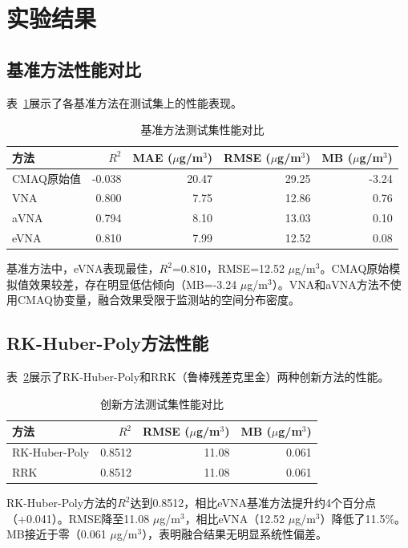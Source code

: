 \documentclass[UTF8, a4paper, 12pt]{article}
\begin{document}
\section{实验结果}

\subsection{基准方法性能对比}

表~\ref{tab:benchmark}展示了各基准方法在测试集上的性能表现。

\begin{table}[htbp]
\centering
\caption{基准方法测试集性能对比}
\label{tab:benchmark}
\begin{tabular}{@{}lrrrr@{}}
\toprule
方法 & $R^2$ & MAE ($\mu$g/m$^3$) & RMSE ($\mu$g/m$^3$) & MB ($\mu$g/m$^3$) \\
\midrule
CMAQ原始值 & -0.038 & 20.47 & 29.25 & -3.24 \\
VNA & 0.800 & 7.75 & 12.86 & 0.76 \\
aVNA & 0.794 & 8.10 & 13.03 & 0.10 \\
eVNA & 0.810 & 7.99 & 12.52 & 0.08 \\
\bottomrule
\end{tabular}
\end{table}

基准方法中，eVNA表现最佳，$R^2$=0.810，RMSE=12.52 $\mu$g/m$^3$。CMAQ原始模拟值效果较差，存在明显低估倾向（MB=-3.24 $\mu$g/m$^3$）。VNA和aVNA方法不使用CMAQ协变量，融合效果受限于监测站的空间分布密度。

\subsection{RK-Huber-Poly方法性能}

表~\ref{tab:innovation}展示了RK-Huber-Poly和RRK（鲁棒残差克里金）两种创新方法的性能。

\begin{table}[htbp]
\centering
\caption{创新方法测试集性能对比}
\label{tab:innovation}
\begin{tabular}{@{}lrrr@{}}
\toprule
方法 & $R^2$ & RMSE ($\mu$g/m$^3$) & MB ($\mu$g/m$^3$) \\
\midrule
RK-Huber-Poly & 0.8512 & 11.08 & 0.061 \\
RRK & 0.8512 & 11.08 & 0.061 \\
\bottomrule
\end{tabular}
\end{table}

RK-Huber-Poly方法的$R^2$达到0.8512，相比eVNA基准方法提升约4个百分点（+0.041）。RMSE降至11.08 $\mu$g/m$^3$，相比eVNA（12.52 $\mu$g/m$^3$）降低了11.5\%。MB接近于零（0.061 $\mu$g/m$^3$），表明融合结果无明显系统性偏差。
\end{document}
